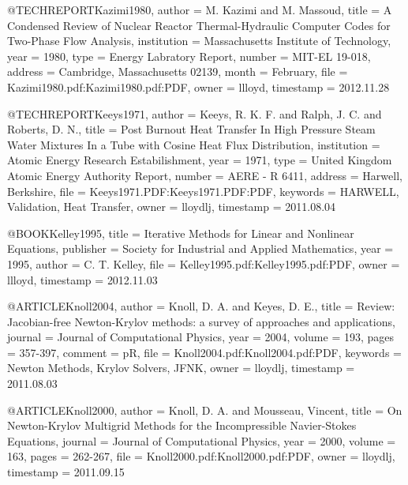 {@TECHREPORT{Kazimi1980,
  author = {M. Kazimi and M. Massoud},
  title = {A Condensed Review of Nuclear Reactor Thermal-Hydraulic Computer
	Codes for Two-Phase Flow Analysis},
  institution = {Massachusetts Institute of Technology},
  year = {1980},
  type = {Energy Labratory Report},
  number = {MIT-EL 19-018},
  address = {Cambridge, Massachusetts 02139},
  month = {February},
  file = {Kazimi1980.pdf:Kazimi1980.pdf:PDF},
  owner = {llloyd},
  timestamp = {2012.11.28}
}

@TECHREPORT{Keeys1971,
  author = {Keeys, R. K. F. and Ralph, J. C. and Roberts, D. N.},
  title = {Post Burnout Heat Transfer In High Pressure Steam Water Mixtures
	In a Tube with Cosine Heat Flux Distribution},
  institution = {Atomic Energy Research Estabilishment},
  year = {1971},
  type = {United Kingdom Atomic Energy Authority Report},
  number = {AERE - R 6411},
  address = {Harwell, Berkshire},
  file = {Keeys1971.PDF:Keeys1971.PDF:PDF},
  keywords = {HARWELL, Validation, Heat Transfer},
  owner = {lloydlj},
  timestamp = {2011.08.04}
}

@BOOK{Kelley1995,
  title = {Iterative Methods for Linear and Nonlinear Equations},
  publisher = {Society for Industrial and Applied Mathematics},
  year = {1995},
  author = {C. T. Kelley},
  file = {Kelley1995.pdf:Kelley1995.pdf:PDF},
  owner = {llloyd},
  timestamp = {2012.11.03}
}

@ARTICLE{Knoll2004,
  author = {Knoll, D. A. and Keyes, D. E.},
  title = {Review: Jacobian-free Newton-Krylov methods: a survey of approaches
	and applications},
  journal = {Journal of Computational Physics},
  year = {2004},
  volume = {193},
  pages = {357-397},
  comment = {pR},
  file = {Knoll2004.pdf:Knoll2004.pdf:PDF},
  keywords = {Newton Methods, Krylov Solvers, JFNK},
  owner = {lloydlj},
  timestamp = {2011.08.03}
}

@ARTICLE{Knoll2000,
  author = {Knoll, D. A. and Mousseau, Vincent},
  title = {On Newton-Krylov Multigrid Methods for the Incompressible Navier-Stokes
	Equations},
  journal = {Journal of Computational Physics},
  year = {2000},
  volume = {163},
  pages = {262-267},
  file = {Knoll2000.pdf:Knoll2000.pdf:PDF},
  owner = {lloydlj},
  timestamp = {2011.09.15}
}

}
